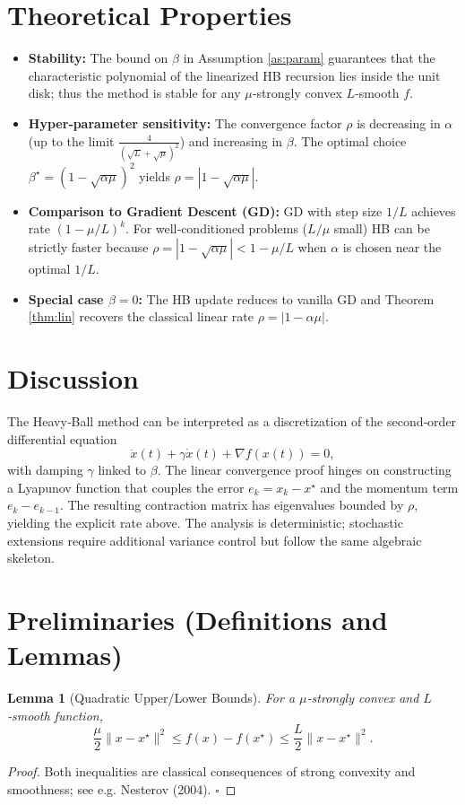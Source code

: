 \documentclass{article}
\newtheorem{lemma}{Lemma}
\begin{document}
\section*{Theoretical Properties}
\begin{itemize}
\item \textbf{Stability:} The bound on $\beta$ in Assumption \ref{as:param} guarantees that the characteristic polynomial of the linearized HB recursion lies inside the unit disk; thus the method is stable for any $\mu$‑strongly convex $L$‑smooth $f$.
\item \textbf{Hyper‑parameter sensitivity:} The convergence factor $\rho$ is decreasing in $\alpha$ (up to the limit $\frac{4}{(\sqrt{L}+\sqrt{\mu})^{2}}$) and increasing in $\beta$. The optimal choice $\beta^{\star}=(1-\sqrt{\alpha\mu})^{2}$ yields $\rho=|1-\sqrt{\alpha\mu}|$.
\item \textbf{Comparison to Gradient Descent (GD):} GD with step size $1/L$ achieves rate $(1-\mu/L)^{k}$. For well‑conditioned problems ($L/\mu$ small) HB can be strictly faster because $\rho=|1-\sqrt{\alpha\mu}|<1-\mu/L$ when $\alpha$ is chosen near the optimal $1/L$.
\item \textbf{Special case $\beta=0$:} The HB update reduces to vanilla GD and Theorem \ref{thm:lin} recovers the classical linear rate $\rho=|1-\alpha\mu|$.
\end{itemize}

\section*{Discussion}
The Heavy‑Ball method can be interpreted as a discretization of the second‑order differential equation
\[
\ddot{x}(t)+\gamma\dot{x}(t)+\nabla f(x(t))=0,
\]
with damping $\gamma$ linked to $\beta$. The linear convergence proof hinges on constructing a Lyapunov function that couples the error $e_{k}=x_{k}-x^{\star}$ and the momentum term $e_{k}-e_{k-1}$. The resulting contraction matrix has eigenvalues bounded by $\rho$, yielding the explicit rate above. The analysis is deterministic; stochastic extensions require additional variance control but follow the same algebraic skeleton.

\newpage

\section*{Preliminaries (Definitions and Lemmas)}
\begin{lemma}[Quadratic Upper/Lower Bounds]\label{lem:quad}
For a $\mu$‑strongly convex and $L$‑smooth function,
\[
\frac{\mu}{2}\|x-x^{\star}\|^{2}\le f(x)-f(x^{\star})\le\frac{L}{2}\|x-x^{\star}\|^{2}.
\]
\end{lemma}
\begin{proof}
Both inequalities are classical consequences of strong convexity and smoothness; see e.g. Nesterov (2004). \hfill $\square$
\end{proof}
\end{document}
